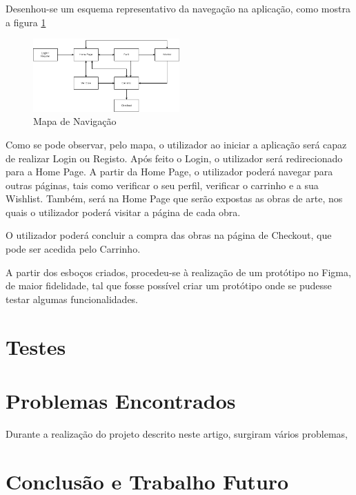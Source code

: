 \documentclass[conference]{IEEEtran}
\begin{document}
Desenhou-se um esquema representativo da navegação na aplicação, como mostra a figura \ref{fig:navmap}

\begin{figure}[h]
    \centering
    \includegraphics[width=0.5\textwidth]{artstore+map.drawio.png}
    \caption{Mapa de Navigação}
    \label{fig:navmap}
\end{figure}

Como se pode observar, pelo mapa, o utilizador ao iniciar a aplicação será capaz de realizar Login ou Registo. 
Após feito o Login, o utilizador será redirecionado para a Home Page. A partir da Home Page, o utilizador poderá 
navegar para outras páginas, tais como verificar o seu perfil, verificar o carrinho e a sua Wishlist. Também, 
será na Home Page que serão expostas as obras de arte, nos quais o utilizador poderá visitar a página de cada obra. 

O utilizador poderá concluir a compra das obras na página de Checkout, que pode ser acedida pelo Carrinho.

A partir dos esboços criados, procedeu-se à realização de um protótipo no Figma, de maior fidelidade, tal que 
fosse possível criar um protótipo onde se pudesse testar algumas funcionalidades.





\section{Testes}

\section{Problemas Encontrados}

Durante a realização do projeto descrito neste artigo, surgiram vários problemas, 

\section{Conclusão e Trabalho Futuro}



\end{document}
